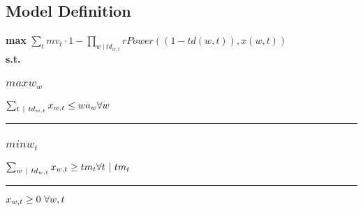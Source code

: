 \documentclass[11pt]{article}
\begin{document}
\subsection*{Model Definition}
\textbf{max} $\sum_{t} mv_{t} \cdot 1 - \prod_{w ~ | ~ td_{w,t}}  rPower((1 - td(w,t)),x(w,t)) $\\
\textbf{s.t.}
\subsubsection*{$maxw_{w}$}
$
\sum_{t ~ | ~ td_{w,t}} x_{w,t} \leq wa_{w}\hfill \forall w
$
\vspace{5pt}
\hrule
\subsubsection*{$minw_{t}$}
$
\sum_{w ~ | ~ td_{w,t}} x_{w,t} \geq tm_{t}\hfill \forall t ~ | ~ tm_{t}
$
\vspace{5pt}
\hrule
\bigskip
$x_{w,t}\geq 0 ~ \forall w,t\\$
\end{document}

